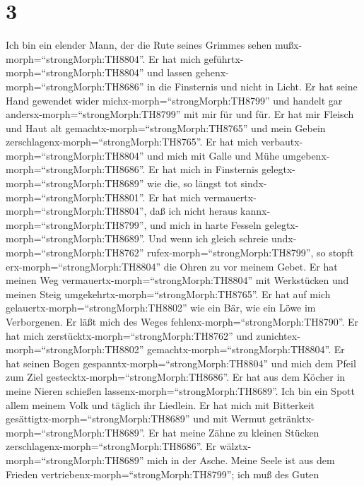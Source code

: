 \hypertarget{section-2}{%
\section{3}\label{section-2}}

 Ich bin ein elender Mann, der die Rute seines Grimmes sehen
mußx-morph=``strongMorph:TH8804''.  Er hat mich
geführtx-morph=``strongMorph:TH8804'' und lassen
gehenx-morph=``strongMorph:TH8686'' in die Finsternis und nicht in
Licht.  Er hat seine Hand gewendet wider
michx-morph=``strongMorph:TH8799'' und handelt gar
andersx-morph=``strongMorph:TH8799'' mit mir für und für. 
Er hat mir Fleisch und Haut alt gemachtx-morph=``strongMorph:TH8765''
und mein Gebein zerschlagenx-morph=``strongMorph:TH8765''. 
Er hat mich verbautx-morph=``strongMorph:TH8804'' und mich mit Galle und
Mühe umgebenx-morph=``strongMorph:TH8686''.  Er hat mich in
Finsternis gelegtx-morph=``strongMorph:TH8689'' wie die, so längst tot
sindx-morph=``strongMorph:TH8801''.  Er hat mich
vermauertx-morph=``strongMorph:TH8804'', daß ich nicht heraus
kannx-morph=``strongMorph:TH8799'', und mich in harte Fesseln
gelegtx-morph=``strongMorph:TH8689''.  Und wenn ich gleich
schreie undx-morph=``strongMorph:TH8762''
rufex-morph=``strongMorph:TH8799'', so stopft
erx-morph=``strongMorph:TH8804'' die Ohren zu vor meinem Gebet.
 Er hat meinen Weg vermauertx-morph=``strongMorph:TH8804''
mit Werkstücken und meinen Steig
umgekehrtx-morph=``strongMorph:TH8765''.  Er hat auf mich
gelauertx-morph=``strongMorph:TH8802'' wie ein Bär, wie ein Löwe im
Verborgenen.  Er läßt mich des Weges
fehlenx-morph=``strongMorph:TH8790''. Er hat mich
zerstücktx-morph=``strongMorph:TH8762'' und
zunichtex-morph=``strongMorph:TH8802''
gemachtx-morph=``strongMorph:TH8804''.  Er hat seinen Bogen
gespanntx-morph=``strongMorph:TH8804'' und mich dem Pfeil zum Ziel
gestecktx-morph=``strongMorph:TH8686''.  Er hat aus dem
Köcher in meine Nieren schießen lassenx-morph=``strongMorph:TH8689''.
 Ich bin ein Spott allem meinem Volk und täglich ihr
Liedlein.  Er hat mich mit Bitterkeit
gesättigtx-morph=``strongMorph:TH8689'' und mit Wermut
getränktx-morph=``strongMorph:TH8689''.  Er hat meine Zähne
zu kleinen Stücken zerschlagenx-morph=``strongMorph:TH8686''. Er
wälztx-morph=``strongMorph:TH8689'' mich in der Asche. 
Meine Seele ist aus dem Frieden
vertriebenx-morph=``strongMorph:TH8799''; ich muß des Guten
